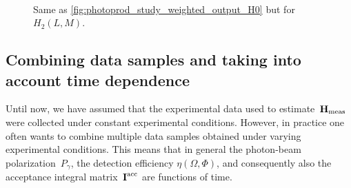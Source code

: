 \begin{figure}[tbp]
  \centering%
  \\%
  \caption{Same as \cref{fig:photoprod_study_weighted_output_H0} but
  for $H_2(L, M)$.}%
  \label{fig:photoprod_study_weighted_output_H2}%
\end{figure}


\clearpage
\subsection{Combining data samples and taking into account time dependence}%
\label{sec:photoprod:comb_data}

Until now, we have assumed that the experimental data used to
estimate~$\bm{\mathrm{H}}_\text{meas}$ were collected under constant
experimental conditions.  However, in practice one often wants to
combine multiple data samples obtained under varying experimental
conditions.  This means that in general the photon-beam
polarization~$P_\gamma$, the detection efficiency $\eta(\Omega,
\Phi)$, and consequently also the acceptance integral
matrix~$\bm{\mathrm{I}}^\text{acc}$ are functions of time.

